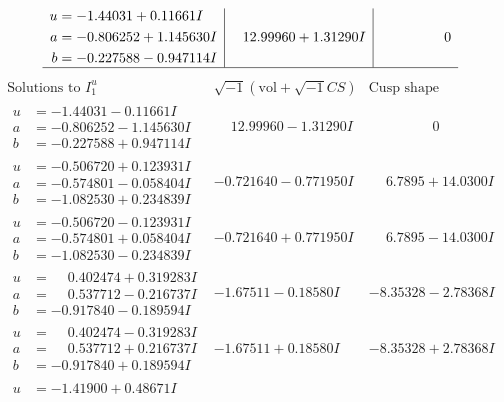 \documentclass[1p]{elsarticle_modified}
\theoremstyle{definition}
\newcommand{\I}{\sqrt{-1}}
\begin{document}
$$\begin{array}{c|c|c}
\begin{aligned}
u &= -1.44031 + 0.11661 I \\
a &= -0.806252 + 1.145630 I \\
b &= -0.227588 - 0.947114 I\end{aligned}
 & \phantom{-}12.99960 + 1.31290 I & \phantom{-0.000000 } 0\\
 \hline 
 \end{array}$$\newpage$$\begin{array}{c|c|c}  
\text{Solutions to }I^u_{1}& \I (\text{vol} + \sqrt{-1}CS) & \text{Cusp shape}\\
 \hline 
\begin{aligned}
u &= -1.44031 - 0.11661 I \\
a &= -0.806252 - 1.145630 I \\
b &= -0.227588 + 0.947114 I\end{aligned}
 & \phantom{-}12.99960 - 1.31290 I & \phantom{-0.000000 } 0 \\ \hline\begin{aligned}
u &= -0.506720 + 0.123931 I \\
a &= -0.574801 - 0.058404 I \\
b &= -1.082530 + 0.234839 I\end{aligned}
 & -0.721640 - 0.771950 I & \phantom{-}6.7895 + 14.0300 I \\ \hline\begin{aligned}
u &= -0.506720 - 0.123931 I \\
a &= -0.574801 + 0.058404 I \\
b &= -1.082530 - 0.234839 I\end{aligned}
 & -0.721640 + 0.771950 I & \phantom{-}6.7895 - 14.0300 I \\ \hline\begin{aligned}
u &= \phantom{-}0.402474 + 0.319283 I \\
a &= \phantom{-}0.537712 - 0.216737 I \\
b &= -0.917840 - 0.189594 I\end{aligned}
 & -1.67511 - 0.18580 I & -8.35328 - 2.78368 I \\ \hline\begin{aligned}
u &= \phantom{-}0.402474 - 0.319283 I \\
a &= \phantom{-}0.537712 + 0.216737 I \\
b &= -0.917840 + 0.189594 I\end{aligned}
 & -1.67511 + 0.18580 I & -8.35328 + 2.78368 I \\ \hline\begin{aligned}
u &= -1.41900 + 0.48671 I \\

\end{aligned}
\end{array}$$
\end{document}

